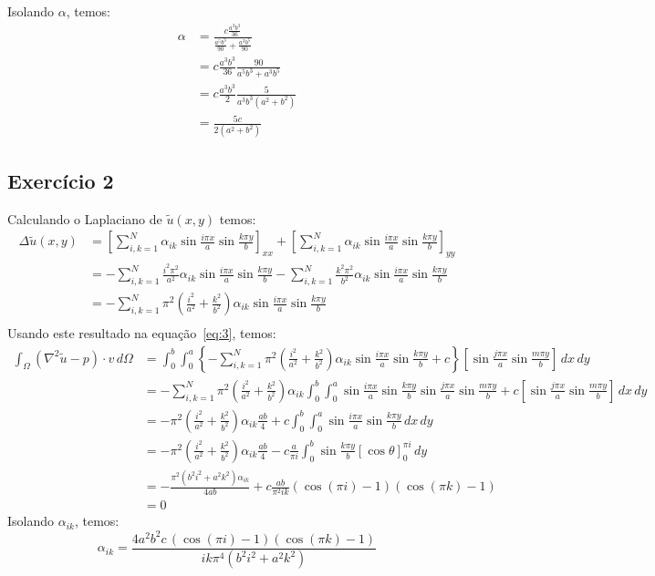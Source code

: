 \documentclass[10pt,a4paper]{article}
\begin{document}
	Isolando $\alpha$, temos:
	\begin{align*}
		\alpha  &= \frac{c\frac{a^3b^3}{36}}{\frac{a^5b^3}{90} + \frac{a^3b^5}{90}}\\
		&= c\frac{a^3b^3}{36}\frac{90}{a^5b^3+a^3b^5}\\
		&= c\frac{a^3b^3}{2}\frac{5}{a^3b^3(a^2+b^2)}\\
		&= \frac{5c}{2(a^2+b^2)}
	\end{align*}
	
	\subsection{Exercício 2}
	Calculando o Laplaciano de $\tilde{u}(x,y)$ temos:
	\begin{align*}
		\Delta \tilde{u}(x,y) &= \left[\sum_{i,k=1}^N\alpha_{ik}\sin{\frac{i\pi x}{a}}\sin{\frac{k\pi y}{b}}\right]_{xx} + \left[\sum_{i,k=1}^N\alpha_{ik}\sin{\frac{i\pi x}{a}}\sin{\frac{k\pi y}{b}}\right]_{yy}\\
		&= -\sum_{i,k=1}^N\frac{i^2\pi^2}{a^2}\alpha_{ik}\sin{\frac{i\pi x}{a}}\sin{\frac{k\pi y}{b}} -\sum_{i,k=1}^N\frac{k^2\pi^2}{b^2}\alpha_{ik}\sin{\frac{i\pi x}{a}}\sin{\frac{k\pi y}{b}}\\
		&= -\sum_{i,k=1}^N\pi^2\left(\frac{i^2}{a^2}+\frac{k^2}{b^2}\right)\alpha_{ik}\sin{\frac{i\pi x}{a}}\sin{\frac{k\pi y}{b}}\\
	\end{align*}
	Usando este resultado na equação~\ref{eq:3}, temos:
	\begin{align*}
		\int_\Omega \left(\nabla^2\tilde{u}-p\right)\cdot v\,d\Omega &= \int_0^b \int_0^a \left\{-\sum_{i,k=1}^N\pi^2\left(\frac{i^2}{a^2}+\frac{k^2}{b^2}\right)\alpha_{ik}\sin{\frac{i\pi x}{a}}\sin{\frac{k\pi y}{b}} + c\right\} \left[ \sin{\frac{j\pi x}{a}}\sin{\frac{m\pi y}{b}} \right] \,dx\,dy\\
&=-\sum_{i,k=1}^N\pi^2\left(\frac{i^2}{a^2}+\frac{k^2}{b^2}\right)\alpha_{ik}\int_0^b \int_0^a \sin{\frac{i\pi x}{a}}\sin{\frac{k\pi y}{b}}\sin{\frac{j\pi x}{a}}\sin{\frac{m\pi y}{b}} + c \left[ \sin{\frac{j\pi x}{a}}\sin{\frac{m\pi y}{b}} \right] \,dx\,dy\\
&= -\pi^2\left(\frac{i^2}{a^2}+\frac{k^2}{b^2}\right)\alpha_{ik} \frac{ab}{4} + c \int_0^b \int_0^a \sin{\frac{i\pi x}{a}}\sin{\frac{k\pi y}{b}} \,dx\,dy\\
&= -\pi^2\left(\frac{i^2}{a^2}+\frac{k^2}{b^2}\right)\alpha_{ik}\frac{ab}{4} - c \frac{a}{\pi i} \int_0^b\sin{\frac{k\pi y}{b}}\left[\cos{\theta}\right]_0^{\pi i}\,dy\\
&= -\frac{\pi^2(b^2i^2+a^2k^2)\alpha_{ik}}{4ab} + c \frac{ab}{\pi^2 ik} (\cos{(\pi i)}-1)(\cos{(\pi k)}-1)\\
&= 0
	\end{align*}
	Isolando $\alpha_{ik}$, temos:
	\[\alpha_{ik}  = \frac{4a^2b^2c\,(\cos{(\pi i)}-1)(\cos{(\pi k)}-1)}{ik\pi^4(b^2i^2+a^2k^2)}\]
\end{document}
